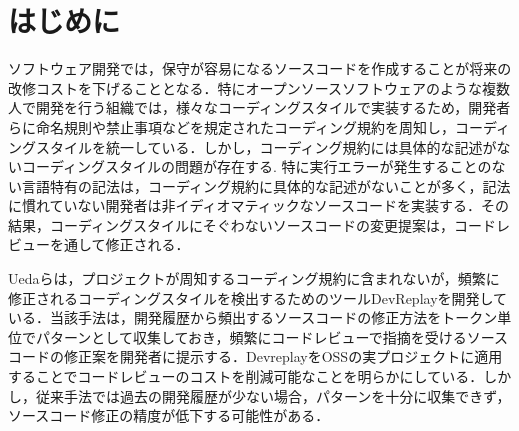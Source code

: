 \documentclass[T,J]{fose} %
\newcommand{\todo}[1]{\colorbox{yellow}{{\bf TODO}:}{\color{red} {\textbf{[#1]}}}}
\newcommand{\change}[1]{\colorbox{green}{{\bf CHANGE}:}{\color{black} {\textbf{[#1]}}}}
\begin{document}
\section{はじめに}

ソフトウェア開発では，保守が容易になるソースコードを作成することが将来の改修コストを下げることとなる\cite{costdown}．特にオープンソースソフトウェアのような複数人で開発を行う組織では，様々なコーディングスタイルで実装するため，開発者らに命名規則や禁止事項などを規定されたコーディング規約を周知し，コーディングスタイルを統一している\cite{EffectsSAT}．しかし，コーディング規約には具体的な記述がないコーディングスタイルの問題が存在する.\cite{ueda2020}
特に実行エラーが発生することのない言語特有の記法は，コーディング規約に具体的な記述がないことが多く，記法に慣れていない開発者は非イディオマティックなソースコードを実装する\cite{idiom}．その結果，コーディングスタイルにそぐわないソースコードの変更提案は，コードレビューを通して修正される．


Uedaらは，プロジェクトが周知するコーディング規約に含まれないが，頻繁に修正されるコーディングスタイルを検出するためのツールDevReplayを開発している．\cite{devreplay}当該手法は，開発履歴から頻出するソースコードの修正方法をトークン単位でパターンとして収集しておき，頻繁にコードレビューで指摘を受けるソースコードの修正案を開発者に提示する．DevreplayをOSSの実プロジェクトに適用することでコードレビューのコストを削減可能なことを明らかにしている．しかし，従来手法では過去の開発履歴が少ない場合，パターンを十分に収集できず，ソースコード修正の精度が低下する可能性がある．

\end{document}
